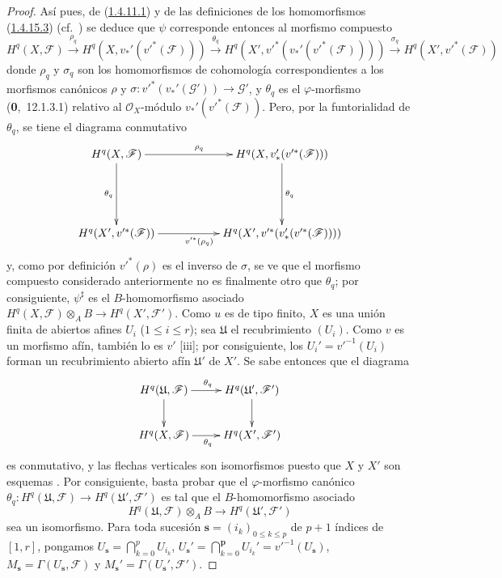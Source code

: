 \begin{proof}
Así pues, de (\hyperref[III.1.4.11.1]{1.4.11.1}) y de las definiciones de los homomorfismos (\hyperref[III.1.4.15.3]{1.4.15.3}) (cf.~) se deduce que $\psi$ corresponde entonces al morfismo compuesto
\[
H^q(X,\mathcal F)\xrightarrow{\rho_q}
H^q(X,v_*'(v'^*(\mathcal F)))\xrightarrow{\theta_q}
H^q(X',v'^*(v_*'(v'^*(\mathcal F))))\xrightarrow{\sigma_q}
H^q(X',v'^*(\mathcal F))
\]
donde $\rho_q$ y $\sigma_q$ son los homomorfismos de cohomología correspondientes a los morfismos canónicos $\rho$ y $\sigma:v'^*(v_*'(\mathcal G'))\to\mathcal G'$, y $\theta_q$ es el $\varphi$-morfismo (\textbf{0},~12.1.3.1) relativo al $\mathcal O_X$-módulo $v_*'(v'^*(\mathcal F))$.
Pero, por la funtorialidad de $\theta_q$, se tiene el diagrama conmutativo
\[
\xymatrix{
H^q(X,\mathcal F)\ar[rr]^{\rho_q}\ar[dd]_{\theta_q}
&&H^q(X,v_*'(v'^*(\mathcal F)))\ar[dd]^{\theta_q}\\\\
H^q(X',v'^*(\mathcal F))\ar[rr]_{v'^*(\rho_q)}
&&H^q(X',v'^*(v_*'(v'^*(\mathcal F))))
}
\]
y, como por definición  $v'^*(\rho)$ es el inverso de $\sigma$, se ve que el morfismo compuesto considerado anteriormente no es finalmente otro que $\theta_q$; por consiguiente, $\psi^\sharp$ es el $B$-homomorfismo asociado $H^q(X,\mathcal F)\otimes_A B\to H^q(X',\mathcal F')$.
Como $u$ es de tipo finito, $X$ es una unión finita de abiertos afines $U_i$ ($1\leq i\leq r$); sea $\mathfrak U$ el recubrimiento $(U_i)$.
Como $v$ es un morfismo afín, también lo es $v'$ [iii]; por consiguiente, los $U_i'=v'^{-1}(U_i)$ forman un recubrimiento abierto afín $\mathfrak U'$ de $X'$.
Se sabe entonces  que el diagrama
\[
\xymatrix{
H^q(\mathfrak U,\mathcal F)\ar[r]^{\theta_q}\ar[d]
&H^q(\mathfrak U',\mathcal F')\ar[d]\\
H^q(X,\mathcal F)\ar[r]_{\theta_q}&H^q(X',\mathcal F')
}
\]
es conmutativo, y las flechas verticales son isomorfismos puesto que $X$ y $X'$ son esquemas .
Por consiguiente, basta probar que el $\varphi$-morfismo canónico $\theta_q:H^q(\mathfrak U,\mathcal F)\to H^q(\mathfrak U',\mathcal F')$ es tal que el $B$-homomorfismo asociado
\[
H^q(\mathfrak U,\mathcal F)\otimes_A B
\longrightarrow H^q(\mathfrak U',\mathcal F')
\]
sea un isomorfismo.
Para toda sucesión $\mathbf s=(i_k)_{0\leq k\leq p}$ de $p+1$ índices de $[1,r]$, pongamos $U_{\mathbf s}=\bigcap\limits_{k=0}^pU_{i_k}$, $U_{\mathbf s}'=\bigcap\limits_{k=0}^{\boldsymbol{p}}U_{i_k}'=v'^{-1}(U_{\mathbf s})$, $M_{\mathbf s}=\Gamma(U_{\mathbf s},\mathcal F)$ y $M_{\mathbf s}'=\Gamma(U_{\mathbf s}',\mathcal F')$.

\end{proof}
